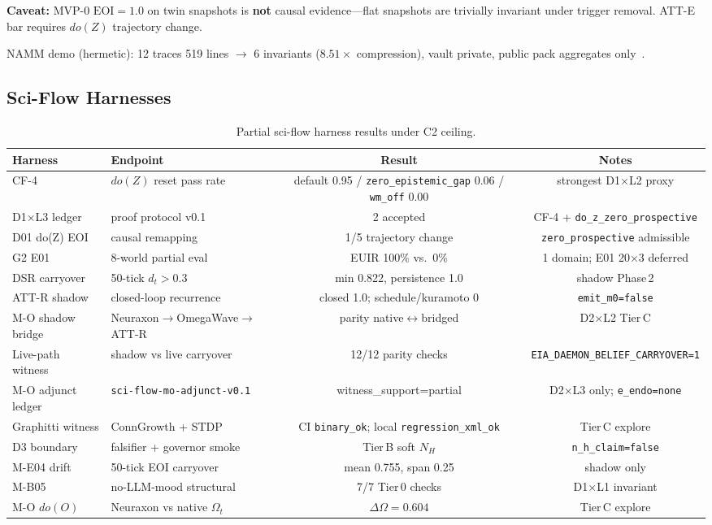 \documentclass[11pt,a4paper]{article}
\theoremstyle{definition}
\begin{document}
\textbf{Caveat:} MVP-0 $\mathrm{EOI}{=}1.0$ on twin snapshots is \textbf{not} causal evidence---flat snapshots are trivially invariant under trigger removal. ATT-E bar requires $do(Z)$ trajectory change.

NAMM demo (hermetic): 12 traces 519 lines $\to$ 6 invariants ($8.51\times$ compression), vault private, public pack aggregates only~\cite{kuznetsov2026namm}.

\subsection{Sci-Flow Harnesses}
\begin{table}[H]
\centering\small
\begin{tabular}{lp{4.8cm}cc}
\toprule Harness & Endpoint & Result & Notes \\ \midrule
CF-4 & $do(Z)$ reset pass rate & default 0.95 / \texttt{zero\_epistemic\_gap} 0.06 / \texttt{wm\_off} 0.00 & strongest D1$\times$L2 proxy \\
D1$\times$L3 ledger & proof protocol v0.1 & 2 accepted & CF-4 + \texttt{do\_z\_zero\_prospective} \\
D01 do(Z) EOI & causal remapping & 1/5 trajectory change & \texttt{zero\_prospective} admissible \\
G2 E01 & 8-world partial eval & EUIR 100\% vs.\ 0\% & 1 domain; E01 20$\times$3 deferred \\
DSR carryover & 50-tick $d_t{>}0.3$ & min 0.822, persistence 1.0 & shadow Phase\,2 \\
ATT-R shadow & closed-loop recurrence & closed 1.0; schedule/kuramoto 0 & \texttt{emit\_m0=false} \\
M-O shadow bridge & Neuraxon$\to$OmegaWave$\to$ATT-R & parity native$\leftrightarrow$bridged & D2$\times$L2 Tier\,C \\
Live-path witness & shadow vs live carryover & 12/12 parity checks & \texttt{EIA\_DAEMON\_BELIEF\_CARRYOVER=1} \\
M-O adjunct ledger & \texttt{sci-flow-mo-adjunct-v0.1} & witness\_support=partial & D2$\times$L3 only; \texttt{e\_endo=none} \\
Graphitti witness & ConnGrowth + STDP & CI \texttt{binary\_ok}; local \texttt{regression\_xml\_ok} & Tier\,C explore \\
D3 boundary & falsifier + governor smoke & Tier\,B soft $N_H$ & \texttt{n\_h\_claim=false} \\
M-E04 drift & 50-tick EOI carryover & mean 0.755, span 0.25 & shadow only \\
M-B05 & no-LLM-mood structural & 7/7 Tier\,0 checks & D1$\times$L1 invariant \\
M-O $do(O)$ & Neuraxon vs native $\Omega_t$ & $\Delta\Omega{=}0.604$ & Tier\,C explore \\ \bottomrule
\end{tabular}
\caption{Partial sci-flow harness results under C2 ceiling.}
\end{table}
\end{document}
